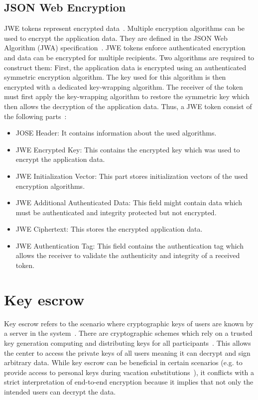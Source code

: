 \documentclass[../main.tex]{subfiles}
\begin{document}
\subsection{JSON Web Encryption}
\label{sec:jwe}
JWE tokens represent encrypted data~\cite{JWE2015}.
Multiple encryption algorithms can be used to encrypt the application data.
They are defined in the JSON Web Algorithm (JWA) specification~\cite{JWA2015}.
JWE tokens enforce authenticated encryption and data can be encrypted for multiple recipients.
Two algorithms are required to construct them:
First, the application data is encrypted using an authenticated symmetric encryption algorithm.
The key used for this algorithm is then encrypted with a dedicated key-wrapping algorithm.
The receiver of the token must first apply the key-wrapping algorithm to restore the symmetric key which then allows the decryption of the application data.
Thus, a JWE token consist of the following parts~\cite{JWE2015}:
\begin{itemize}
    \item JOSE Header:
    It contains information about the used algorithms.
    \item JWE Encrypted Key:
    This contains the encrypted key which was used to encrypt the application data.
    \item JWE Initialization Vector: This part stores initialization vectors of the used encryption algorithms.
    \item JWE Additional Authenticated Data: This field might contain data which must be authenticated and integrity protected but not encrypted.
    \item JWE Ciphertext: This stores the encrypted application data.
    \item JWE Authentication Tag: This field contains the authentication tag which allows the receiver to validate the authenticity and integrity of a received token.
\end{itemize}


\section{Key escrow}
\label{sec:key-escrow}
Key escrow refers to the scenario where cryptographic keys of users are known by a server in the system~\cite{Gentry2003}.
There are cryptographic schemes which rely on a trusted key generation computing and distributing keys for all participants~\cite{Sakai2007, Bethencourt2007}.
This allows the center to access the private keys of all users meaning it can decrypt and sign arbitrary data.
While key escrow can be beneficial in certain scenarios (e.g. to provide access to personal keys during vacation substitutions~\cite{Hagg2022}), it conflicts with a strict interpretation of end-to-end encryption because it implies that not only the intended users can decrypt the data.
\end{document}
